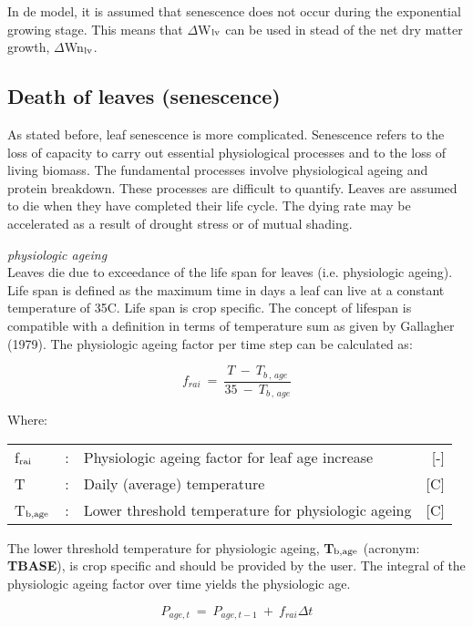 In de model, it is assumed that senescence does not occur during the exponential growing
stage. This means that $\Delta$W$_{{\rm lv}}$ can be used in stead of the net dry matter 
growth, $\Delta$Wn$_{{\rm lv}}$.

\subsection{Death of leaves (senescence)}
\label{sec:LeafSenescence}
As stated before, leaf senescence is more complicated. Senescence refers to the loss of
capacity to carry out essential physiological processes and to the loss of living biomass.
The fundamental processes involve physiological ageing and protein breakdown. These
processes are difficult to quantify. Leaves are assumed to die when they have completed
their life cycle. The dying rate may be accelerated as a result of drought stress or of
mutual shading.

{\it physiologic ageing}\\
Leaves die due to exceedance of the life span for leaves (i.e. physiologic ageing). Life
span is defined as the maximum time in days a leaf can live at a constant temperature of
35\textdegree C. Life span is crop specific. The concept of lifespan is compatible with a definition
in terms of temperature sum as given by Gallagher (1979).
The physiologic ageing factor per time step can be calculated as:

\begin{equation}
f _{rai} ~=~{\frac{ T~-~T _{b\, ,\, age} }{35~-~ T _{b\, ,\, age} }}
\end{equation}

Where:\\[5pt]
\begin{tabularx}{\textwidth}{llXr}
	f$_{{\rm rai}}$ &:& Physiologic ageing factor for leaf age increase   & 	[-]\\
	T &:& Daily (average) temperature   & 	[\textdegree C]\\
	T$_{{\rm b,age}}$ &:& Lower threshold temperature for physiologic ageing   & 	[\textdegree C]\\
\end{tabularx}

The lower threshold temperature for physiologic ageing, {\bf T$_{{\rm b,age}}$} (acronym: {\bf TBASE}), is
crop specific and should be provided by the user. The integral of the physiologic ageing
factor over time yields the physiologic age. 

\begin{equation}
\label{eq:5.57}
P _{age,t} ~=~ P _{age,t-1} ~+~f_{rai} \Delta t
\end{equation}


